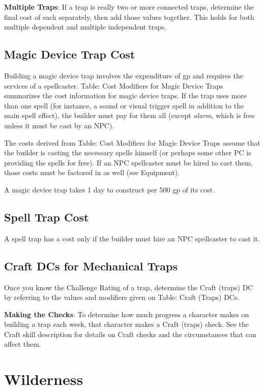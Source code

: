 \textbf{Multiple Traps}: If a trap is really two or more connected traps, determine the final cost of each separately, then add those values together. This holds for both multiple dependent and multiple independent traps.
				
\subsection{Magic Device Trap Cost}

				
Building a magic device trap involves the expenditure of gp and requires the services of a spellcaster. Table: Cost Modifiers for Magic Device Traps summarizes the cost information for magic device traps. If the trap uses more than one spell (for instance, a sound or visual trigger spell in addition to the main spell effect), the builder must pay for them all (except \textit{alarm}, which is free unless it must be cast by an NPC).
				
The costs derived from Table: Cost Modifiers for Magic Device Traps assume that the builder is casting the necessary spells himself (or perhaps some other PC is providing the spells for free). If an NPC spellcaster must be hired to cast them, those costs must be factored in as well (see Equipment).
				
A magic device trap takes 1 day to construct per 500 gp of its cost.
				
\subsection{Spell Trap Cost}

				
A spell trap has a cost only if the builder must hire an NPC spellcaster to cast it.
				
\subsection{Craft DCs for Mechanical Traps}

				
Once you know the Challenge Rating of a trap, determine the Craft (traps) DC by referring to the values and modifiers given on Table: Craft (Traps) DCs.
				
\textbf{Making the Checks}: To determine how much progress a character makes on building a trap each week, that character makes a Craft (traps) check. See the Craft skill description for details on Craft checks and the circumstances that can affect them.
				
\section{Wilderness}

